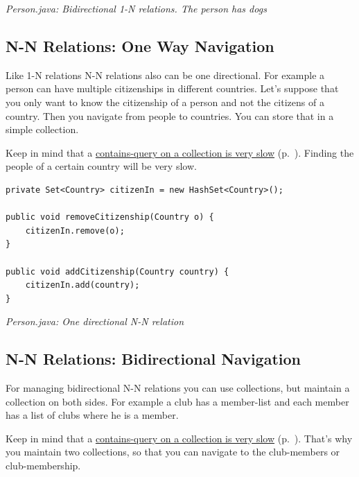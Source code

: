 {\small\itshape Person.java: Bidirectional 1-N relations. The person has dogs\par}
\medskip

\subsection{N-N Relations: One Way Navigation}
\label{ref:best-practises-managing-relations:nton-nav}

Like 1-N relations N-N relations also can be one directional. For example a person can have multiple citizenships in different countries. Let's suppose that you only want to know the citizenship of a person and not the citizens of a country. Then you navigate from people to countries. You can store that in a simple collection.

Keep in mind that a \hyperref[ref:basics-querying-soda-soda-performance-characteristics]{contains-query on a collection is very slow} (p.~\pageref{ref:basics-querying-soda-soda-performance-characteristics}). Finding the people of a certain country will be very slow.

\begin{lstlisting}
private Set<Country> citizenIn = new HashSet<Country>();

public void removeCitizenship(Country o) {
    citizenIn.remove(o);
}

public void addCitizenship(Country country) {
    citizenIn.add(country);
}
\end{lstlisting}

{\small\itshape Person.java: One directional N-N relation\par}
\medskip

\subsection{N-N Relations: Bidirectional Navigation}
\label{ref:best-practises-managing-relations:nton-bidirect}

For managing bidirectional N-N relations you can use collections, but maintain a collection on both sides. For example a club has a member-list and each member has a list of clubs where he is a member.

Keep in mind that a \hyperref[ref:basics-querying-soda-soda-performance-characteristics]{contains-query on a collection is very slow} (p.~\pageref{ref:basics-querying-soda-soda-performance-characteristics}). That's why you maintain two collections, so that you can navigate to the club-members or club-membership.

